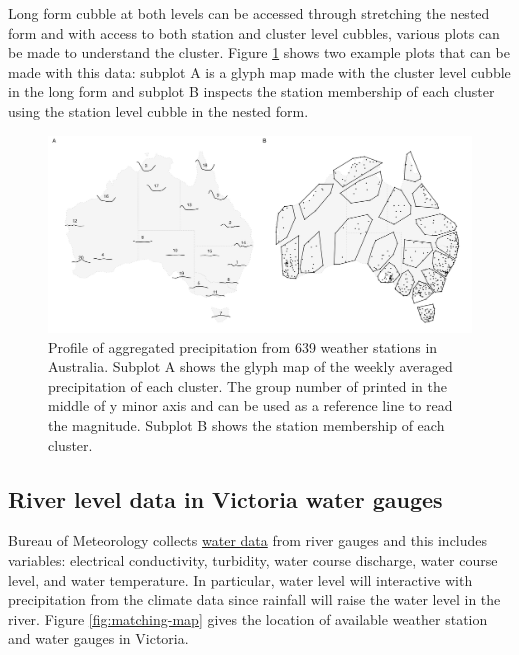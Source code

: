 \documentclass[
]{jss}
\begin{document}
Long form cubble at both levels can be accessed through stretching the
nested form and with access to both station and cluster level cubbles,
various plots can be made to understand the cluster. Figure
\ref{fig:basic-agg} shows two example plots that can be made with this
data: subplot A is a glyph map made with the cluster level cubble in the
long form and subplot B inspects the station membership of each cluster
using the station level cubble in the nested form.

\begin{CodeChunk}
\begin{figure}

{\centering \includegraphics[width=1\linewidth]{figures/basic-agg} 

}

\caption[Profile of aggregated precipitation from 639 weather stations in Australia]{Profile of aggregated precipitation from 639 weather stations in Australia. Subplot A shows the glyph map of the weekly averaged precipitation of each cluster. The group number of printed in the middle of y minor axis and can be used as a reference line to read the magnitude. Subplot B shows the station membership of each cluster.}\label{fig:basic-agg}
\end{figure}
\end{CodeChunk}

\hypertarget{river-level-data-in-victoria-water-gauges}{%
\subsection{River level data in Victoria water
gauges}\label{river-level-data-in-victoria-water-gauges}}

Bureau of Meteorology collects
\href{http://www.bom.gov.au/metadata/catalogue/19115/ANZCW0503900528?template=full}{water
data} from river gauges and this includes variables: electrical
conductivity, turbidity, water course discharge, water course level, and
water temperature. In particular, water level will interactive with
precipitation from the climate data since rainfall will raise the water
level in the river. Figure \ref{fig:matching-map} gives the location of
available weather station and water gauges in Victoria.
\end{document}
